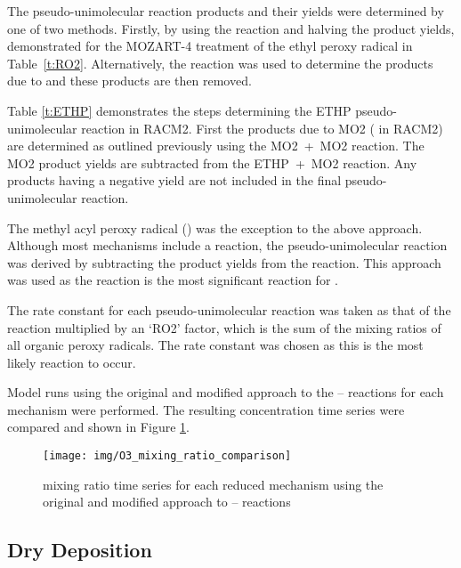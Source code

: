 The pseudo-unimolecular reaction products and their yields were determined by one of two methods.
Firstly, by using the  reaction and halving the product yields, demonstrated for the MOZART-4 treatment of the ethyl peroxy radical in \mbox{Table \ref{t:RO2}}. 
Alternatively, the  reaction was used to determine the products due to  and these products are then removed.

Table \ref{t:ETHP} demonstrates the steps determining the ETHP pseudo-unimolecular reaction in RACM2. 
First the products due to MO2 ( in RACM2) are determined as outlined previously using the \mbox{MO2 + MO2} reaction. 
The MO2 product yields are subtracted from the \mbox{ETHP + MO2} reaction. 
Any products having a negative yield are not included in the final pseudo-unimolecular reaction.

The methyl acyl peroxy radical () was the exception to the above approach. 
Although most mechanisms include a \mbox{} reaction, the  pseudo-unimolecular reaction was derived by subtracting the  product yields from the \mbox{} reaction. 
This approach was used as the \mbox{} reaction is the most significant reaction for .

The rate constant for each pseudo-unimolecular reaction was taken as that of the \mbox{} reaction multiplied by an `RO2' factor, which is the sum of the mixing ratios of all organic peroxy radicals. 
The \mbox{} rate constant was chosen as this is the most likely reaction to occur. 

Model runs using the original and modified approach to the -- reactions for each mechanism were performed.
The resulting  concentration time series were compared and shown in Figure \ref{f:O3_concentrations}.
%
\begin{figure}[t!]
    \begin{center}
        \texttt{[image: img/O3\_mixing\_ratio\_comparison]}
        \caption{ mixing ratio time series for each reduced mechanism using the original and modified approach to -- reactions} 
        \label{f:O3_concentrations}
    \end{center}
\end{figure}
%
\subsection{Dry Deposition}

